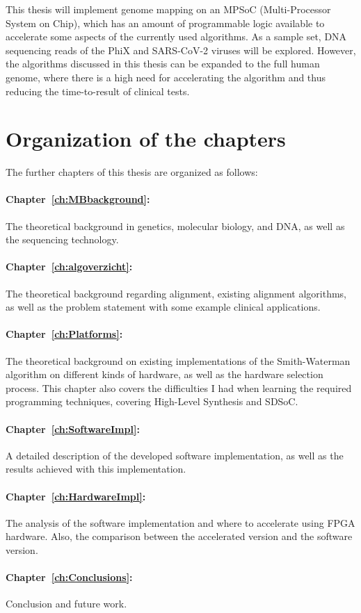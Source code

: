 This thesis will implement genome mapping on an MPSoC (Multi-Processor System on Chip), which has an amount of programmable logic available to accelerate some aspects of the currently used algorithms. As a sample set, DNA sequencing reads of the PhiX and SARS-CoV-2 viruses will be explored. However, the algorithms discussed in this thesis can be expanded to the full human genome, where there is a high need for accelerating the algorithm and thus reducing the time-to-result of clinical tests.

\section{Organization of the chapters}

The further chapters of this thesis are organized as follows:

\paragraph{Chapter~\ref{ch:MBbackground}:} The theoretical background in genetics, molecular biology, and DNA, as well as the sequencing technology.
\paragraph{Chapter~\ref{ch:algoverzicht}:} The theoretical background regarding alignment, existing alignment algorithms, as well as the problem statement with some example clinical applications.
\paragraph{Chapter~\ref{ch:Platforms}:} The theoretical background on existing implementations of the Smith-Waterman algorithm on different kinds of hardware, as well as the hardware selection process. This chapter also covers the difficulties I had when learning the required programming techniques, covering High-Level Synthesis and SDSoC.
\paragraph{Chapter~\ref{ch:SoftwareImpl}:} A detailed description of the developed software implementation, as well as the results achieved with this implementation.
\paragraph{Chapter~\ref{ch:HardwareImpl}:} The analysis of the software implementation and where to accelerate using FPGA hardware. Also, the comparison between the accelerated version and the software version.
\paragraph{Chapter~\ref{ch:Conclusions}:} Conclusion and future work.